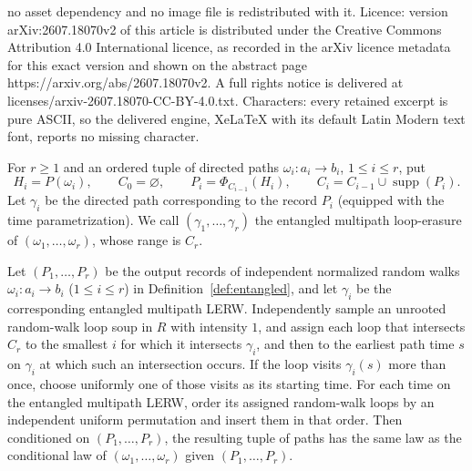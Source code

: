 \documentclass[10pt,a4paper]{amsart}
\newcommand{\supp}{\operatorname{supp}}
\begin{document}
no asset dependency and no image file is redistributed with it. Licence: version arXiv:2607.18070v2 of this article is distributed under the Creative Commons Attribution 4.0 International licence, as recorded in the arXiv licence metadata for this exact version and shown on the abstract page https://arxiv.org/abs/2607.18070v2. A full rights notice is delivered at licenses/arxiv-2607.18070-CC-BY-4.0.txt. Characters: every retained excerpt is pure ASCII, so the delivered engine, XeLaTeX with its default Latin Modern text font, reports no missing character.
\begin{definition}\label{def:entangled}
For $r\ge1$ and an ordered tuple of directed paths $\omega_i:a_i\to b_i$, $1\le i\le r$, put
\begin{equation}\label{eq:sequential-reduction}
 H_i=P(\omega_i),\qquad C_0=\varnothing,\qquad
 P_i=\Phi_{C_{i-1}}(H_i),\qquad
 C_i=C_{i-1}\cup\supp(P_i).
\end{equation}
Let $\gamma_i$ be the directed path corresponding to the record $P_i$ (equipped with the time parametrization).  We call $(\gamma_1,\ldots,\gamma_r)$
the entangled multipath loop-erasure of $(\omega_1,\ldots,\omega_r)$, whose range is $C_r$.
\end{definition}

\begin{proposition}\label{prop:entangled-recovery}
Let $(P_1,\ldots,P_r)$ be the output records of independent normalized random walks
$\omega_i:a_i\to b_i$ ($1\le i\le r$) in Definition~\ref{def:entangled}, and let $\gamma_i$ be the corresponding
 entangled multipath LERW.  Independently sample an unrooted random-walk loop soup in $R$ with intensity $1$, and assign each loop that intersects $C_r$ to the smallest $i$ for which
it intersects $\gamma_i$, and then to the earliest path time $s$ on $\gamma_i$
at which such an intersection occurs.  If the loop visits $\gamma_i(s)$ more than once, choose uniformly one of those visits as its starting time. For each time on the entangled multipath LERW, order its assigned random-walk loops by an independent
uniform permutation and insert them in that order. Then conditioned on
$(P_1,\ldots,P_r)$, the resulting tuple of paths has the same law as the conditional law of $(\omega_1,\ldots,\omega_r)$ given $(P_1,\ldots,P_r)$.
\end{proposition}
\end{document}
